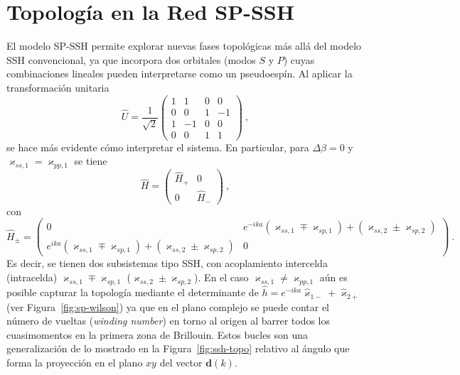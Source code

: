 \section{Topología en la Red SP-SSH}
El modelo SP-SSH permite explorar nuevas fases topológicas más allá del modelo SSH convencional, ya que incorpora dos orbitales (modos $S$ y $P$) cuyas combinaciones lineales pueden interpretarse como un pseudoespín. Al aplicar la transformación unitaria 
\begin{equation*}
	\hat{U} = \frac{1}{\sqrt{2}}\begin{pmatrix}
		1 & 1 & 0 & 0 \\
		0 & 0 & 1 & -1 \\
		1 & -1 & 0 & 0 \\
		0 & 0 & 1 & 1
	\end{pmatrix} \ ,
\end{equation*} 
se hace más evidente cómo interpretar el sistema. En particular, para $\Delta\beta = 0$ y $\varkappa_{ss,1}=\varkappa_{pp,1}$ se tiene 
\begin{equation*}
	\hat{H} = \begin{pmatrix}
		\hat{H}_+ & 0 \\
		0 & \hat{H}_-
	\end{pmatrix} \ ,
\end{equation*} 
con
\begin{equation*}
	\hat{H}_\pm = \begin{pmatrix}
		0 & e^{-ika}(\varkappa_{ss,1}\mp \varkappa_{sp,1}) + (\varkappa_{ss,2}\pm \varkappa_{sp,2}) \\
		e^{ika}(\varkappa_{ss,1}\mp \varkappa_{sp,1}) + (\varkappa_{ss,2}\pm \varkappa_{sp,2}) & 0
	\end{pmatrix} \ .
\end{equation*}
Es decir, se tienen dos subsistemas tipo SSH, con acoplamiento intercelda (intracelda) $\varkappa_{ss,1}\mp \varkappa_{sp,1}$ ($\varkappa_{ss,2}\pm \varkappa_{sp,2}$). En el caso $\varkappa_{ss,1}\neq\varkappa_{pp,1}$ aún es posible capturar la topología mediante el determinante de $\hat{h}=e^{-ika}\hat{\varkappa}_{1-} + \hat{\varkappa}_{2+}$ (ver Figura~\ref{fig:sp-wilson}) ya que en el plano complejo se puede contar el número de vueltas (\textit{winding number}) en torno al origen al barrer todos los cuasimomentos en la primera zona de Brillouin. Estos bucles son una generalización de lo mostrado en la Figura~\ref{fig:ssh-topo} relativo al ángulo que forma la proyección en el plano $xy$ del vector $\mathbf{d}(k)$.


